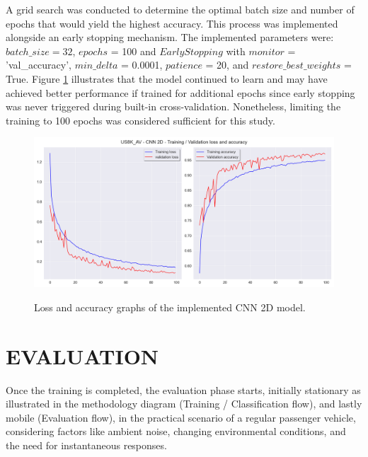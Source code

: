 A grid search was conducted to determine the optimal batch size and number of epochs that would yield the highest accuracy. This process was implemented alongside an early stopping mechanism. The implemented parameters were: $batch\_size = 32$, $epochs$ = 100 and $EarlyStopping$ with $monitor$ = 'val\_accuracy', $min\_delta$ = 0.0001, $patience$ = 20, and $restore\_best\_weights$ = True. Figure \ref{fig:methods_training_CNN_2D_loss_and_accuracy_graphs} illustrates that the model continued to learn and may have achieved better performance if trained for additional epochs since early stopping was never triggered during built-in cross-validation. Nonetheless, limiting the training to 100 epochs was considered sufficient for this study.


\begin{figure}[htbp]
    \raggedright
        \caption{Loss and accuracy graphs of the implemented CNN 2D model.}
        \includegraphics[width=1\textwidth]{resources/images/050-methods/Methods_training_CNN2D_loss_accuracy.png}
        \label{fig:methods_training_CNN_2D_loss_and_accuracy_graphs}
\end{figure} 


\section{EVALUATION}
\label{sec:methods_evaluation}

Once the training is completed, the evaluation phase starts, initially stationary as illustrated in the methodology diagram (Training / Classification flow), and lastly mobile (Evaluation flow), in the practical scenario of a regular passenger vehicle, considering factors like ambient noise, changing environmental conditions, and the need for instantaneous responses.

